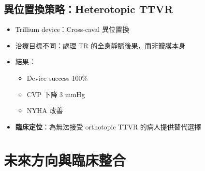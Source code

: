 \documentclass[12pt,a4paper]{article}
\begin{document}
\subsection{異位置換策略：Heterotopic TTVR}

\begin{itemize}[leftmargin=*]
    \item Trillium device：Cross-caval 異位置換
    \item 治療目標不同：處理 TR 的全身靜脈後果，而非瓣膜本身
    \item 結果：
    \begin{itemize}[nosep]
        \item Device success 100\%
        \item CVP 下降 3 mmHg
        \item NYHA 改善
    \end{itemize}
    \item \textbf{臨床定位}：為無法接受 orthotopic TTVR 的病人提供替代選擇
\end{itemize}

\section{未來方向與臨床整合}
\end{document}
